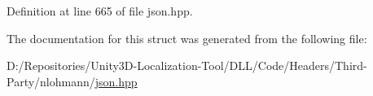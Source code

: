 Definition at line 665 of file json.\+hpp.



The documentation for this struct was generated from the following file\+:\begin{DoxyCompactItemize}
\item 
D\+:/\+Repositories/\+Unity3\+D-\/\+Localization-\/\+Tool/\+D\+L\+L/\+Code/\+Headers/\+Third-\/\+Party/nlohmann/\mbox{\hyperlink{json_8hpp}{json.\+hpp}}\end{DoxyCompactItemize}
